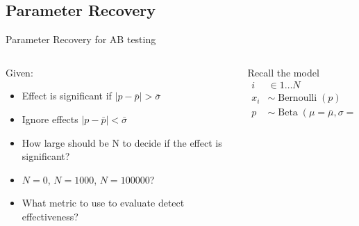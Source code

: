 \documentclass{beamer}
\begin{document}
\subsection{Parameter Recovery}
\begin{frame}{Parameter Recovery for AB testing}
\begin{columns}
\begin{column}{0.6\linewidth}
Given:
\begin{itemize}
    \item<1-> Effect is significant if $|p-\bar p|>\bar \sigma$
    \item<2-> Ignore effects $|p-\bar p|<\bar \sigma$
    \item<3-> How large should be N to decide if the effect is significant?
    \item<4-> $N=0$, $N=1000$, $N=100000$?
    \item<5-> What metric to use to evaluate detect effectiveness?
\end{itemize}
\end{column}
\begin{column}{0.4\linewidth}
Recall the model
\begin{align*}
    i&\in 1\dots N\\
    x_i & \sim \operatorname{Bernoulli}(p)\\
    p &\sim \operatorname{Beta}(\mu=\bar\mu, \sigma=\bar\sigma)
\end{align*}
\end{column}
\end{columns}
\end{frame}
\end{document}
